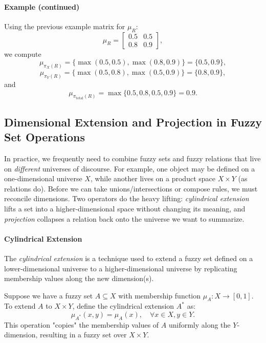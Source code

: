 \paragraph{Example (continued)}

Using the previous example matrix for \( \mu_R \):
\[
    \mu_R = \begin{bmatrix}
    0.5 & 0.5 \\
    0.8 & 0.9
    \end{bmatrix},
\]
we compute
\[
    \mu_{\pi_X(R)} = \{\max(0.5,0.5), \max(0.8,0.9)\} = \{0.5, 0.9\},
\]
\[
    \mu_{\pi_Y(R)} = \{\max(0.5,0.8), \max(0.5,0.9)\} = \{0.8, 0.9\},
\]
and
\[
    \mu_{\pi_{\text{total}}(R)} = \max\{0.5, 0.8, 0.5, 0.9\} = 0.9.
\]


\subsection{Dimensional Extension and Projection in Fuzzy Set Operations}
\label{sec:fuzzyrelations_dimensional_extension_and_projection_in_fuzzy_set_operations}

In practice, we frequently need to combine fuzzy sets and fuzzy relations that live on \emph{different} universes of discourse. For example, one object may be defined on a one\hyp{}dimensional universe \(X\), while another lives on a product space \(X\times Y\) (as relations do). Before we can take unions/intersections or compose rules, we must reconcile dimensions. Two operators do the heavy lifting: \emph{cylindrical extension} lifts a set into a higher\hyp{}dimensional space without changing its meaning, and \emph{projection} collapses a relation back onto the universe we want to summarize.

\paragraph{Cylindrical Extension}

The \emph{cylindrical extension} is a technique used to extend a fuzzy set defined on a lower-dimensional universe to a higher-dimensional universe by replicating membership values along the new dimension(s).

Suppose we have a fuzzy set \(A \subseteq X\) with membership function \(\mu_A: X \to [0,1]\). To extend \(A\) to \(X \times Y\), define the cylindrical extension \(A^*\) as:
\begin{equation}
    \mu_{A^*}(x, y) = \mu_A(x), \quad \forall x \in X, y \in Y.
    \label{eq:cylindrical_extension}
\end{equation}
This operation "copies" the membership values of \(A\) uniformly along the \(Y\)-dimension, resulting in a fuzzy set over \(X \times Y\).

